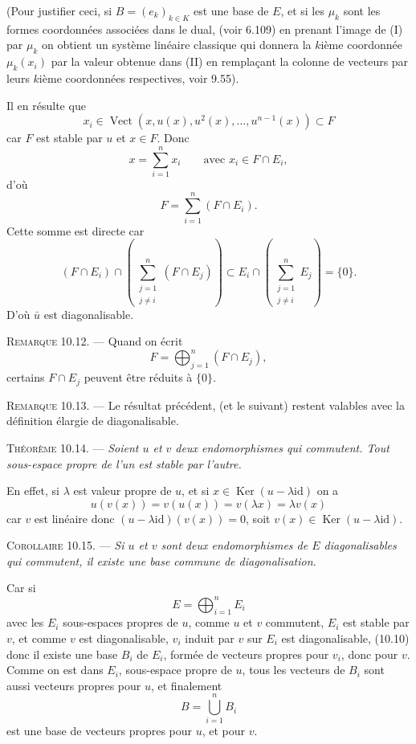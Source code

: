 (Pour justifier ceci, si $B=(e_k)_{k\in K}$ est une base de $E$, et si les $\mu_k$ sont les formes coordonnées associées dans le dual, (voir 6.109) en prenant l'image de (I) par $\mu_k$ on obtient un système linéaire classique qui donnera la $k$ième coordonnée $\mu_k(x_i)$ par la valeur obtenue dans (II) en remplaçant la colonne de vecteurs par leurs $k$ième coordonnées respectives, voir 9.55).

Il en résulte que
\[
x_i\in\operatorname{Vect}(x,u(x),u^2(x),\ldots,u^{n-1}(x))\subset F
\]
car $F$ est stable par $u$ et $x\in F$. Donc
\[
x=\sum_{i=1}^nx_i\qquad\text{avec }x_i\in F\cap E_i,
\]
d'où
\[
F=\sum_{i=1}^n(F\cap E_i).
\]
Cette somme est directe car
\[
(F\cap E_i)\cap\left(\sum_{\substack{j=1\\j\ne i}}^n(F\cap E_j)\right)
\subset E_i\cap\left(\sum_{\substack{j=1\\j\ne i}}^nE_j\right)=\{0\}.
\]
D'où $\bar u$ est diagonalisable. \bookend

\medskip\noindent\textsc{Remarque 10.12.} --- Quand on écrit
\[
F=\bigoplus_{j=1}^n(F\cap E_j),
\]
certains $F\cap E_j$ peuvent être réduits à $\{0\}$.

\medskip\noindent\textsc{Remarque 10.13.} --- Le résultat précédent, (et le suivant) restent valables avec la définition élargie de diagonalisable.

\medskip\noindent\textsc{Théorème 10.14.} --- \emph{Soient $u$ et $v$ deux endomorphismes qui commutent. Tout sous-espace propre de l'un est stable par l'autre.}

En effet, si $\lambda$ est valeur propre de $u$, et si $x\in\operatorname{Ker}(u-\lambda\mathrm{id})$ on a
\[
u(v(x))=v(u(x))=v(\lambda x)=\lambda v(x)
\]
car $v$ est linéaire donc $(u-\lambda\mathrm{id})(v(x))=0$, soit $v(x)\in\operatorname{Ker}(u-\lambda\mathrm{id})$. \bookend

\medskip\noindent\textsc{Corollaire 10.15.} --- \emph{Si $u$ et $v$ sont deux endomorphismes de $E$ diagonalisables qui commutent, il existe une base commune de diagonalisation.}

Car si
\[
E=\bigoplus_{i=1}^nE_i
\]
avec les $E_i$ sous-espaces propres de $u$, comme $u$ et $v$ commutent, $E_i$ est stable par $v$, et comme $v$ est diagonalisable, $v_i$ induit par $v$ sur $E_i$ est diagonalisable, (10.10) donc il existe une base $B_i$ de $E_i$, formée de vecteurs propres pour $v_i$, donc pour $v$. Comme on est dans $E_i$, sous-espace propre de $u$, tous les vecteurs de $B_i$ sont aussi vecteurs propres pour $u$, et finalement
\[
B=\bigcup_{i=1}^nB_i
\]
est une base de vecteurs propres pour $u$, et pour $v$. \bookend

